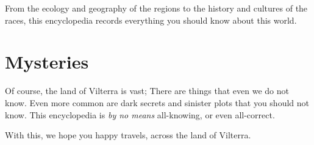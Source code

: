 \documentclass[../main.tex]{subfiles}
\begin{document}
From the ecology and geography of the regions
to the history and cultures of the races, this encyclopedia records everything you
should know about this world.

\section{Mysteries}
Of course, the land of Vilterra is vast; There are things that even
we do not know. Even more common are dark secrets and sinister plots that
you should not know. This encyclopedia is \emph{by no means} all-knowing, or even
all-correct.

With this, we hope you happy travels, across the land of Vilterra.
\end{document}
